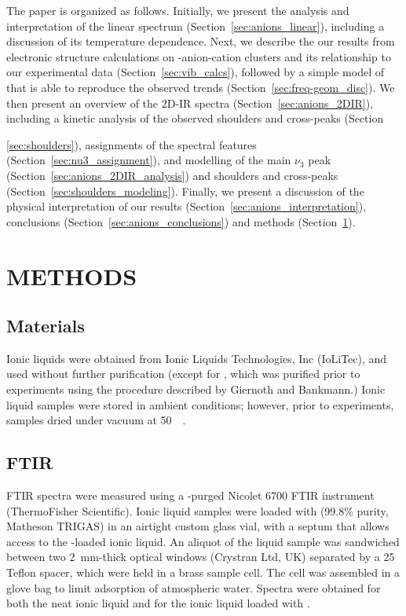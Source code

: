 \documentclass[%
  class = book,%
  crop = false,%
  float = true,%
  multi = true,%
  preview = false,%
]{standalone}
\let\cite\autocite
\newcommand{\caps}[1]{\uppercase{#1}}
\begin{document}
The paper is organized as follows. Initially, we present the analysis and interpretation of the linear  spectrum (Section~\ref{sec:anions_linear}), including a discussion of its temperature dependence. Next, we describe the our results from electronic structure calculations on -anion-cation clusters and its relationship to our experimental data (Section~\ref{sec:vib_calcs}), followed by a simple model of  that is able to reproduce the observed trends (Section~\ref{sec:freq-geom_disc}). We then present an overview of the 2D-IR spectra (Section~\ref{sec:anions_2DIR}), including a kinetic analysis of the observed shoulders and cross-peaks (Section~{\ref{sec:shoulders}), assignments of the spectral features (Section~\ref{sec:nu3_assignment}), and modelling of the main \(\nu_3\) peak (Section~\ref{sec:anions_2DIR_analysis}) and shoulders and cross-peaks (Section~\ref{sec:shoulders_modeling}). Finally, we present a discussion of the physical interpretation of our results (Section~\ref{sec:anions_interpretation}), conclusions (Section~\ref{sec:anions_conclusions}) and methods (Section~\ref{sec:anions_methods}).

\section{\texorpdfstring{\caps{Methods}}{Methods}}
\label{sec:anions_methods}

\subsection{Materials}
\label{sec:anions_methods_materials}

Ionic liquids were obtained from Ionic Liquids Technologies, Inc (IoLiTec), and used without further purification (except for \ce{[Im_{4,1}][BF4]}, which was purified prior to experiments using the procedure described by Giernoth and Bankmann.\cite{Giernoth2008}) Ionic liquid samples were stored in ambient conditions; however, prior to experiments, samples dried under vacuum at \SI{50}{\milli\torr}.

\subsection{FTIR}
\label{sec:anions_methods_ftir}

FTIR spectra were measured using a -purged Nicolet 6700 FTIR instrument (ThermoFisher Scientific). Ionic liquid samples were loaded with  (99.8\% purity, Matheson TRIGAS) in an airtight custom glass vial, with a septum that allows access to the -loaded ionic liquid. An aliquot of the liquid sample was sandwiched between two 2~mm-thick  optical windows (Crystran Ltd, UK) separated by a \SI{25}{\micron} Teflon spacer, which were held in a brass sample cell. The cell was assembled in a glove bag to limit adsorption of atmospheric water. Spectra were obtained for both the neat ionic liquid and for the ionic liquid loaded with .

}
\end{document}
